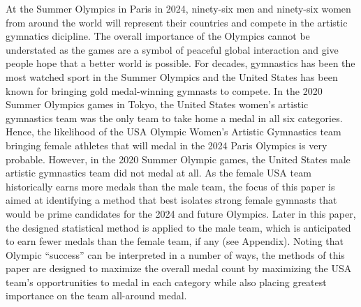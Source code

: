 \documentclass[12pt]{article}
\begin{document}
At the Summer Olympics in Paris in 2024, ninety-six men and ninety-six women from around the world will 
represent their countries and compete in the artistic gymnatics dicipline. The overall importance of the Olympics 
cannot be understated as the games are a symbol of peaceful global interaction and give people hope that a better 
world is possible. For decades, gymnastics has been the most watched sport in the Summer Olympics and the United 
States has been known for bringing gold medal-winning gymnasts to compete. In the 2020 
Summer Olympics games in Tokyo, the United States women's artistic gymnastics team was the only team to take 
home a medal in all six categories. Hence, the likelihood of the USA Olympic Women’s Artistic Gymnastics 
team bringing female athletes that will medal in the 2024 Paris Olympics is very probable. 
However, in the 2020 Summer Olympic games, the United States 
male artistic gymnastics team did not medal at all. As the female USA team historically earns more medals than 
the male team, the focus of this paper is aimed at identifying a method that best isolates strong female gymnasts 
that would be prime candidates for the 2024 and future Olympics. Later in this paper, the designed statistical 
method is applied to the male team, which is anticipated to earn fewer medals than the female team, if any 
(see Appendix). Noting that Olympic ``success'' can be interpreted in a number of ways, the methods of this 
paper are designed to maximize the overall medal count by maximizing the USA team's opportrunities to medal in each 
category while also placing greatest importance on the team all-around medal. 
\end{document}
